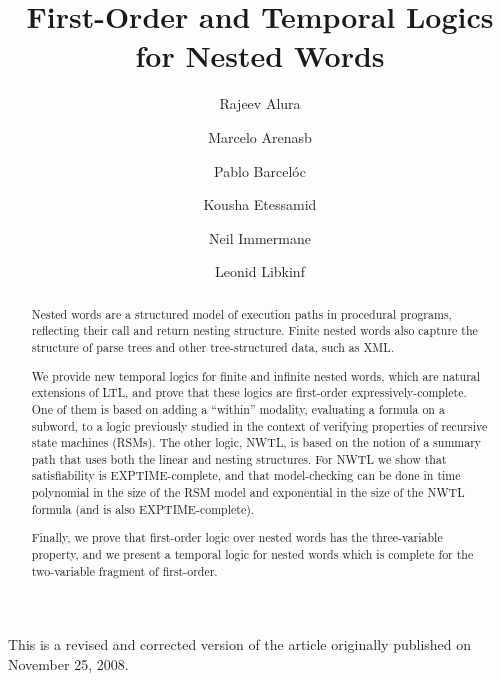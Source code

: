 \documentclass{LMCS}
\theoremstyle{plain}
\theoremstyle{definition}
\begin{document}
\title[First-Order and Temporal Logics for Nested Words]{First-Order and Temporal Logics for Nested Words}


\author[R.~Alur]{Rajeev Alur\rsuper a}
\address{{\lsuper a}Department of Computer and Information Science, University of Pennsylvania}

\author[M.~Arenas]{Marcelo Arenas\rsuper b}
\address{{\lsuper b}Department of Computer Science, Pontificia Universidad Cat\'olica de Chile}

\author[P.~Barcel\'o]{Pablo Barcel\'o\rsuper c}
\address{{\lsuper c}Department of Computer Science, Universidad de Chile}

\author[K.~Etessami]{Kousha Etessami\rsuper d}
\address{{\lsuper d}School of Informatics, University of Edinburgh, Edinburgh}

\author[N.~Immerman]{Neil Immerman\rsuper e}
\address{{\lsuper e}Department of Computer Science,University of Massachusetts}

\author[L.~Libkin]{Leonid Libkin\rsuper f}
\address{{\lsuper f}School of Informatics, University of Edinburgh, Edinburgh}


\begin{revision}
  This is a revised and corrected version of the article originally
  published on November 25, 2008.
\end{revision}

\begin{abstract}
Nested words are a structured model of execution paths in procedural
programs, reflecting their call and return nesting structure.  Finite
nested words also capture the structure of parse trees and other
tree-structured data, such as XML.

We provide new temporal logics for finite and infinite nested words,
which are natural extensions of LTL, and prove that these logics are
first-order expressively-complete.  One of them is based on adding a
``within'' modality, evaluating a formula on a subword, to a logic 
previously studied in the context of verifying properties of recursive
state machines (RSMs). The other logic, NWTL, 
is based on the notion of a summary
path that uses both the linear and nesting structures. For NWTL
we show that satisfiability is EXPTIME-complete, and that
model-checking can be done in time
polynomial in the size of the RSM model and exponential in the size of
the NWTL formula (and is also 
EXPTIME-complete).

Finally, we prove that first-order logic over nested words has the
three-variable property, and we present a temporal logic for nested
words which is complete for the two-variable fragment of first-order.
\end{abstract}
\end{document}
